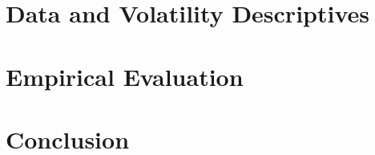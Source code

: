 \documentclass[english, 11pt]{article}
\begin{document}
\section{Data and Volatility Descriptives} 
\label{section:data}

\clearpage	

\section{Empirical Evaluation} \label{section:empirical}

\clearpage


\section{Conclusion} 
\label{section:conclusion}

\clearpage



\clearpage


\end{document}

